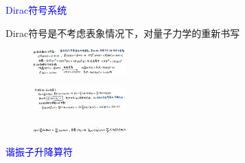 \documentclass[a4paper,8pt]{extarticle} %
\newcommand{\bluetext}[1]{\textcolor{blue}{#1}}
\begin{document}
\begin{multicols}{3}
\bluetext{Dirac符号系统}

Dirac符号是不考虑表象情况下，对量子力学的重新书写\\
\begin{figure}[H]
    \vspace{-0.5cm}
    \centering
    \includegraphics[width=0.32\textwidth]{images/19.png}
    \vspace{-0.6cm}
\end{figure}
\begin{figure}[H]
    \vspace{-0.5cm}
    \centering
    \includegraphics[width=0.32\textwidth]{images/20.png}
    \vspace{-0.6cm}
\end{figure}
\begin{figure}[H]
    \vspace{-0.5cm}
    \centering
    \includegraphics[width=0.32\textwidth]{images/21.png}
    \vspace{-0.6cm}
\end{figure}
\bluetext{谐振子升降算符}


\end{multicols}
\end{document}
